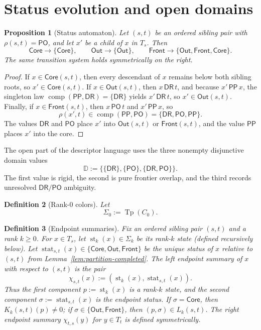 \documentclass[11pt]{article}
\newtheorem{definition}{Definition}[section]
\newtheorem{proposition}[definition]{Proposition}
\theoremstyle{remark}
\newcommand{\DR}{\mathsf{DR}}
\newcommand{\PO}{\mathsf{PO}}
\newcommand{\PP}{\mathsf{PP}}
\newcommand{\Tp}{\operatorname{Tp}}
\newcommand{\st}{\operatorname{st}}
\newcommand{\stat}{\operatorname{stat}}
\newcommand{\comp}{\operatorname{comp}}
\newcommand{\Core}{\mathsf{Core}}
\newcommand{\Out}{\mathsf{Out}}
\newcommand{\Front}{\mathsf{Front}}
\newcommand{\OpenDom}{\mathbb{D}}
\begin{document}
\section{Status evolution and open domains}

\begin{proposition}[Status automaton]\label{prop:status-automaton-completed}
Let $(s,t)$ be an ordered sibling pair with $\rho(s,t)=\PO$, and let $x'$ be a child of $x$ in $T_s$. Then
\[
\Core\to\{\Core\},\qquad \Out\to\{\Out\},\qquad \Front\to\{\Out,\Front,\Core\}.
\]
The same transition system holds symmetrically on the right.
\end{proposition}

\begin{proof}
If $x\in\Core(s,t)$, then every descendant of $x$ remains below both sibling roots, so $x'\in\Core(s,t)$. If $x\in\Out(s,t)$, then $x\,\DR\,t$, and because $x'\,\PP\,x$, the singleton law $\comp(\PP,\DR)=\{\DR\}$ yields $x'\,\DR\,t$, so $x'\in\Out(s,t)$. Finally, if $x\in\Front(s,t)$, then $x\,\PO\,t$ and $x'\,\PP\,x$, so
\[
\rho(x',t)\in \comp(\PP,\PO)=\{\DR,\PO,\PP\}.
\]
The values $\DR$ and $\PO$ place $x'$ into $\Out(s,t)$ or $\Front(s,t)$, and the value $\PP$ places $x'$ into the core.
\end{proof}

The open part of the descriptor language uses the three nonempty disjunctive domain values
\[
\OpenDom:=\bigl\{\{\DR\},\{\PO\},\{\DR,\PO\}\bigr\}.
\]
The first value is rigid, the second is pure frontier overlap, and the third records unresolved $\DR/\PO$ ambiguity.

\begin{definition}[Rank-$0$ colors]
Let
\[
\Sigma_0:=\Tp(C_0).
\]
\end{definition}

\begin{definition}[Endpoint summaries]\label{def:endpoint-summary}
Fix an ordered sibling pair $(s,t)$ and a rank $k\ge 0$. For $x\in T_s$, let $\st_k(x)\in\Sigma_k$ be its rank-$k$ state (defined recursively below). Let $\stat_{s,t}(x)\in\{\Core,\Out,\Front\}$ be the unique status of $x$ relative to $(s,t)$ from Lemma~\ref{lem:partition-completed}. The \emph{left endpoint summary} of $x$ with respect to $(s,t)$ is the pair
\[
\chi_{s,t}(x):=(\st_k(x),\stat_{s,t}(x)).
\]
Thus the first component $p:=\st_k(x)$ is a rank-$k$ state, and the second component $\sigma:=\stat_{s,t}(x)$ is the endpoint status. If $\sigma=\Core$, then $K_k(s,t)(p)\neq 0$; if $\sigma\in\{\Out,\Front\}$, then $(p,\sigma)\in L_k(s,t)$. The \emph{right endpoint summary} $\chi_{t,s}(y)$ for $y\in T_t$ is defined symmetrically.
\end{definition}
\end{document}
